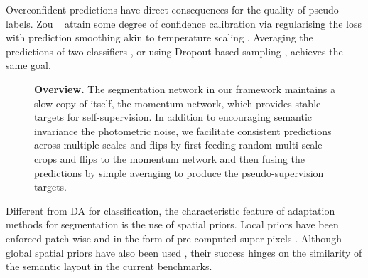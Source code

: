 Overconfident predictions \cite{GuoPSW17} have direct consequences for the quality of pseudo labels.
Zou \etal~\cite{ZouYLKW19} attain some degree of confidence calibration via regularising the loss with prediction smoothing akin to temperature scaling \cite{GuoPSW17}.
Averaging the predictions of two classifiers \cite{Zheng_2020_IJCV}, or using Dropout-based sampling \cite{Cai_2020_CVPR,zhou2020uncertainty}, achieves the same goal.

\begin{figure*}[t]%
\hfill
{}\hfill
{}
\caption{\textbf{Overview.} The segmentation network in our framework \emph{} maintains a slow copy of itself, the momentum network, which provides stable targets for self-supervision. In addition to encouraging semantic invariance \wrt the photometric noise, we facilitate consistent predictions across multiple scales and flips by first \emph{} feeding random multi-scale crops and flips to the momentum network and then \emph{} fusing the predictions by simple averaging to produce the pseudo-supervision targets.} %
\label{fig:batch_fusion}%
\vspace{-0.5em}
\end{figure*}

Different from DA for classification, the characteristic feature of adaptation methods for segmentation is the use of spatial priors.
Local priors have been enforced patch-wise \cite{Chen0G18,LianDLG19,TsaiSSC19} and in the form of pre-computed super-pixels \cite{ZhangDG17,ZhangQYNL020}.
Although global spatial priors have also been used \cite{ZouYKW18}, their success hinges on the similarity of the semantic layout in the current benchmarks.

